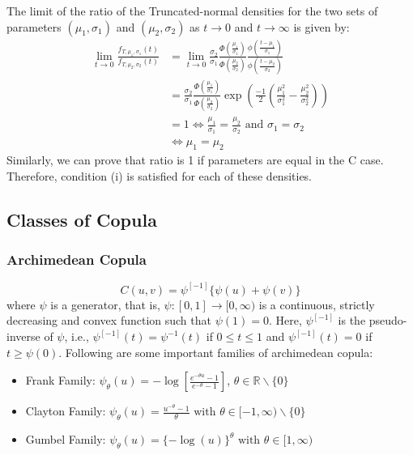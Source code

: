 The limit of the ratio of the Truncated-normal densities for the two sets of parameters $(\mu_1, \sigma_1)$ and $(\mu_2, \sigma_2)$ as $t \to 0 $ and $t \to \infty$ is given by:
\begin{align*}
\lim_{t \to 0} \frac{f_{T, \mu_1, \sigma_1}(t)}{f_{T, \mu_2, \sigma_2}(t)} &= \lim_{t \to 0} \frac{\sigma_2}{\sigma_1} \frac{\Phi(\frac{\mu_1}{\sigma_1})}{\Phi(\frac{\mu_2}{\sigma_2})} \frac{\phi(\frac{t-\mu_1}{\sigma_1})}{\phi(\frac{t-\mu_2}{\sigma_2})}\\
&= \frac{\sigma_2}{\sigma_1} \frac{\Phi(\frac{\mu_1}{\sigma_1})}{\Phi(\frac{\mu_2}{\sigma_2})} \exp \left(\frac{-1}{2} \left(\frac{\mu_1^2}{\sigma_1^2} - \frac{\mu_2^2}{\sigma_2^2}\right)\right)\\
&= 1 \iff \frac{\mu_1}{\sigma_1} = \frac{\mu_2}{\sigma_2} \text{ and } \sigma_1 = \sigma_2\\
&\iff \mu_1 = \mu_2
\end{align*}
Similarly, we can prove that ratio is 1 if parameters are equal in the C case.\\
Therefore, condition (i) is satisfied for each of these densities.

\subsection*{Classes of Copula}
\subsubsection*{Archimedean Copula}
\begin{equation}
	C(u, v) = \psi^{[-1]} \{\psi(u) + \psi(v) \}
\end{equation}
where $\psi$ is a generator, that is, $\psi : [0,1] \to [0, \infty)$ is a continuous, strictly decreasing and convex function such that $\psi(1) = 0$. Here, $\psi^{[-1]}$ is the pseudo-inverse of $\psi$, i.e., $\psi^{[-1]}(t) = \psi^{-1}(t)$ if $0 \leq t \leq 1$ and $\psi^{[-1]}(t) = 0$ if $t \geq \psi(0)$.
Following are some important families of archimedean copula:
\begin{itemize}
	\item Frank Family: \( \psi_\theta (u) = -\log \left[ \frac{e^{-\theta u} - 1}{e^{-\theta} - 1} \right]\),  \( \theta \in \mathbb{R} \backslash \{0\}\)
	\item Clayton Family: \( \psi_\theta (u) = \frac{u^{-\theta} - 1}{\theta} \text{ with } \theta \in [-1, \infty) \backslash \{0\} \)
	\item Gumbel Family: \( \psi_\theta (u) = \{ -\log (u) \}^\theta \text{ with } \theta \in [1, \infty)\)
\end{itemize}

